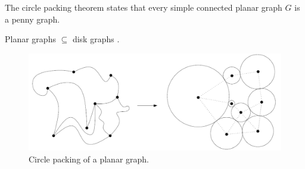 \begin{theorem}
  The circle packing theorem states that every simple connected planar graph
  $G$ is a penny graph. \cite{doi:10.1137/0406017}
\end{theorem}

\begin{corollary}
  Planar graphs $\subseteq$ disk graphs \cite{spinradEfficientGraphRepresentations2012}.
\end{corollary}

\begin{figure}
\centering
\includegraphics[width=1.0\textwidth]{res/circle_packing}
\caption{Circle packing of a planar graph. \cite{nachmiasPlanarMapsRandom2016}}
\label{fig:circle}
\end{figure}
